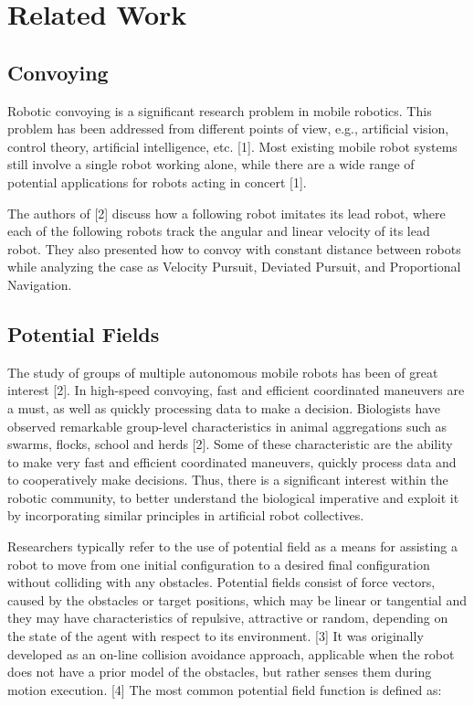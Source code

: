 \chapter{Related Work}
\section{Convoying}
Robotic convoying is a significant research problem in mobile robotics. This problem has been addressed from different points of view, e.g., artificial vision, control theory, artificial intelligence, etc. [1]. Most existing mobile robot systems still involve a single robot working alone, while there are a wide range of potential applications for robots acting in concert [1]. 

The authors of [2] discuss how a following robot imitates its lead robot, where each of the following robots track the angular and linear velocity of its lead robot. They also presented how to convoy with constant distance between robots while analyzing the case as Velocity Pursuit, Deviated Pursuit, and Proportional Navigation.

\section{Potential Fields}
The study of groups of multiple autonomous mobile robots has been of great interest [2]. In high-speed convoying, fast and efficient coordinated maneuvers are a must, as well as quickly processing data to make a decision. Biologists have observed remarkable group-level characteristics in animal aggregations such as swarms, flocks, school and herds [2]. Some of these characteristic are the ability to make very fast and efficient coordinated maneuvers, quickly process data and to cooperatively make decisions. Thus, there is a significant interest within the robotic community, to better understand the biological imperative and exploit it by incorporating similar principles in artificial robot collectives.  

Researchers typically refer to the use of potential field as a means for assisting a robot to move from one initial configuration to a desired final configuration without colliding with any obstacles. Potential fields consist of force vectors, caused by the obstacles or target positions, which may be linear or tangential and they may have characteristics of repulsive, attractive or random, depending on the state of the agent with respect to its environment. [3] It was originally developed as an on-line collision avoidance approach, applicable when the robot does not have a prior model of the obstacles, but rather senses them during motion execution. [4] The most common potential field function is defined as:

